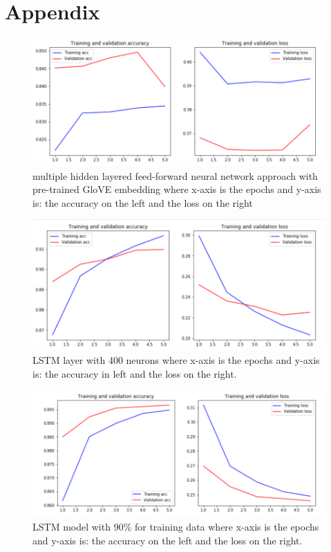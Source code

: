 \section{Appendix}
\label{sec:appendix}

 \begin{figure}[h!]
  \includegraphics{multilayers.png}
  \caption{multiple hidden layered feed-forward neural network approach with pre-trained GloVE embedding where x-axis is the epochs and y-axis is: the accuracy on the left and the loss on the right}
  \label{fig:nnpre}
\end{figure} 

\begin{figure}[h!]
  \includegraphics[width=\linewidth]{LSTM400.png}
  \caption{LSTM layer with 400 neurons where x-axis is the epochs and y-axis is: the accuracy in left and the loss on the right.}
  \label{fig:lstm400}
\end{figure}  

\begin{figure}[h!]
  \includegraphics[width=\linewidth]{train90.png}
  \caption{LSTM model with 90\% for training data where x-axis is the epochs and y-axis is: the accuracy on the left and the loss on the right.}
  \label{fig:lstm90}
\end{figure} 

